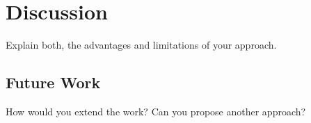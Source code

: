 \chapter{Discussion}\label{sec:discussion}

Explain both, the advantages and limitations of your approach.

\section{Future Work}\label{sec:future_work}

How would you extend the work? Can you propose another approach?